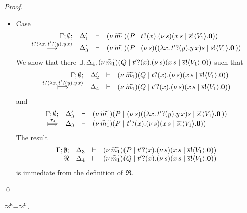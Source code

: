 \begin{proof}
\begin{itemize}
		\item	Case
			\[
				\begin{array}{rcll} \Gamma; \emptyset; &\Delta_1'& \vdash& (\nu\, \widetilde{m_1})(P \;|\; t ? (x) . (\nu\, s)(x\, {s} \;|\; \overline{s} ! \langle V_1 \rangle . \mathbf{0}))\\ \stackrel{t ? \langle  \lambda x.\,t' ? (y) .{y\, {x}}  \rangle}{\longmapsto} &\Delta_3'& \vdash &  (\nu\, \widetilde{m_1})(P \;|\; (\nu\, s)(  (\lambda x.\,t' ? (y) .{y\, {x}}){s}  \;|\; \overline{s} ! \langle V_1 \rangle . \mathbf{0} \, {)}) \end{array}
			\]
			We show that there $\exists, \Delta_4, (\nu\, \widetilde{m_1})(Q \;|\; t' ? (x) . (\nu\, s)(x\, {s} \;|\; \overline{s} ! \langle V_1 \rangle . \mathbf{0}))$ such that
			\[
				\mhorel{\Gamma}{\Delta_2'}{\newsp{\widetilde{m_1}}{Q \Par \hotrigger{t}{x}{s}{V_1}}}
				{\Hby{\bactinp{t}{ \abs{x}{\binp{t'}{y}{\appl{y}{x}}  }}}}
				{\Delta_4}{}{\newsp{\widetilde{m_1}}{Q \Par \hotrigger{t'}{x}{s}{V_1}}}
			\]
			and
			\[
				\mhorel{\Gamma}{\Delta_3'}{\newsp{\widetilde{m_1}}{P \Par \newsp{s}{  \appl{(\abs{x}{\binp{t'}{y}{\appl{y}{x}})}{s}  \Par \bout{\dual{s}}{V_1} \inact }}}}
				{\Hby{\tau_d}}
				{\Delta_3}{}{\newsp{\widetilde{m_1}}{P \Par \hotrigger{t'}{x}{s}{V_1}}}
			\]
			The result
			\[
				\begin{array}{rcll} \Gamma; \emptyset; &\Delta_3& \vdash& (\nu\, \widetilde{m_1})(P \;|\; t' ? (x) . (\nu\, s)(x\, {s} \;|\; \overline{s} ! \langle V_1 \rangle . \mathbf{0}))\\ \Re &\Delta_4& \vdash &  (\nu\, \widetilde{m_1})(Q \;|\; t' ? (x) . (\nu\, s)(x\, {s} \;|\; \overline{s} ! \langle V_1 \rangle . \mathbf{0})) \end{array}
			\]
			is immediate from the definition of $\Re$.

	\end{itemize}
	\qed
\end{proof}



\begin{lemma}
	\label{app:lem:wb_eq_wbf}
	$\approx^\mathtt{H} = \approx^\mathtt{C}$.
\end{lemma}

